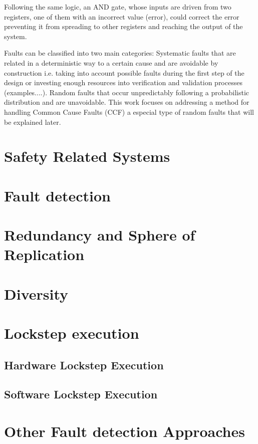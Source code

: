 Following the same logic, an AND gate, whose inputs are driven from two registers, one of them with an incorrect value (error), could correct the error preventing it from spreading to other registers and reaching the output of the system.

Faults can be classified into two main categories: Systematic faults that are related in a deterministic way to a certain cause and are avoidable by construction i.e. taking into account possible faults during the first step of the design or investing enough resources into verification and validation processes (examples....). Random faults that occur unpredictably following a probabilistic distribution and are unavoidable. This work focuses on addressing a method for handling Common Cause Faults (CCF) a especial type of random faults that will be explained later.


\section{Safety Related Systems}



\section{Fault detection}
\section{Redundancy and Sphere of Replication}
\section{Diversity}
\section{Lockstep execution}
\subsection{Hardware Lockstep Execution}
\subsection{Software Lockstep Execution}
\section{Other Fault detection Approaches}
